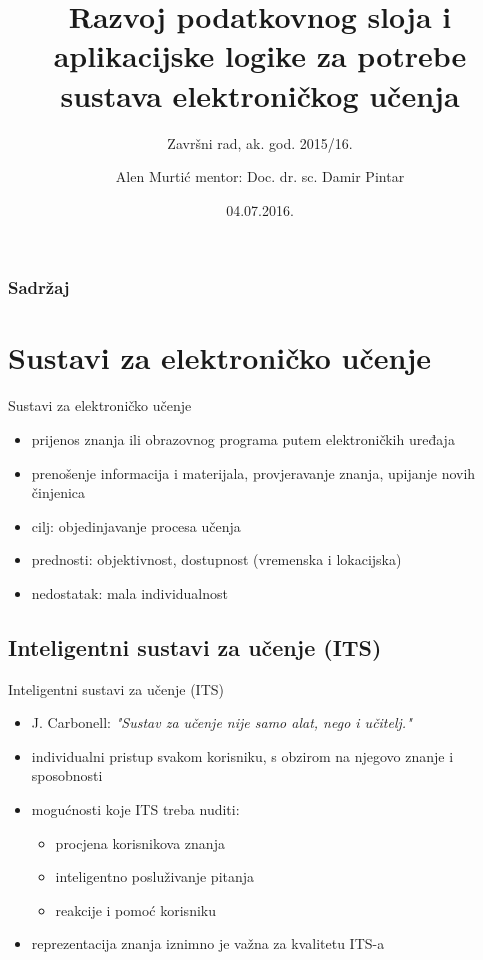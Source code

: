 \documentclass[times, utf8, numeric]{beamer}
\title{Razvoj podatkovnog sloja i aplikacijske logike za potrebe sustava elektroničkog učenja}
\subtitle{Završni rad, ak. god. 2015/16.}
\author{Alen Murtić
	\newline mentor: Doc. dr. sc. Damir Pintar}
\institute{Faklutet elektrotehnike i računarstva, Sveučilište u Zagrebu}
\date{04.07.2016.}
\begin{document}
\begin{frame}
	\titlepage
\end{frame}

\begin{frame}
	\frametitle{Sadržaj}
	\tableofcontents
\end{frame}

\section{Sustavi za elektroničko učenje}

\begin{frame}{Sustavi za elektroničko učenje}
	\begin{itemize}
		\item prijenos znanja ili obrazovnog programa putem elektroničkih uređaja
		\item prenošenje informacija i materijala, provjeravanje znanja, upijanje novih činjenica
		\item cilj: objedinjavanje procesa učenja
		\item prednosti: objektivnost, dostupnost (vremenska i lokacijska)
		\item nedostatak: mala individualnost
	\end{itemize}
\end{frame}

\subsection{Inteligentni sustavi za učenje (ITS)}
\begin{frame}{Inteligentni sustavi za učenje (ITS)}
\begin{itemize}
	\item J. Carbonell: \textit{"Sustav za učenje nije samo alat, nego i učitelj."}
	\item individualni pristup svakom korisniku, s obzirom na njegovo znanje i sposobnosti
	\item mogućnosti koje ITS treba nuditi:
	\begin{itemize}
		\item procjena korisnikova znanja
		\item inteligentno posluživanje pitanja
		\item reakcije i pomoć korisniku
	\end{itemize}
	\item reprezentacija znanja iznimno je važna za kvalitetu ITS-a
\end{itemize}
\end{frame}
\end{document}
